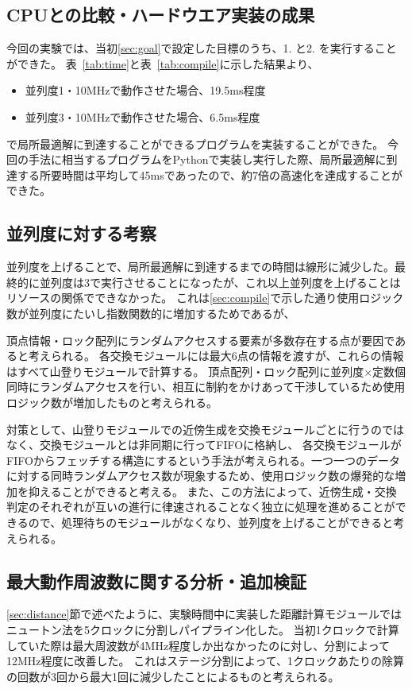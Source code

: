 \subsection{CPUとの比較・ハードウエア実装の成果}
今回の実験では、当初\ref{sec:goal}で設定した目標のうち、1. と2. を実行することができた。
表~\ref{tab:time}と表~\ref{tab:compile}に示した結果より、
\begin{itemize}
    \item 並列度1・10MHzで動作させた場合、19.5ms程度
    \item 並列度3・10MHzで動作させた場合、6.5ms程度
\end{itemize}
で局所最適解に到達することができるプログラムを実装することができた。
今回の手法に相当するプログラムをPythonで実装し実行した際、局所最適解に到達する所要時間は平均して45msであったので、約7倍の高速化を達成することができた。

\subsection{並列度に対する考察}
並列度を上げることで、局所最適解に到達するまでの時間は線形に減少した。最終的に並列度は3で実行させることになったが、これ以上並列度を上げることはリソースの関係でできなかった。
これは\ref{sec:compile}で示した通り使用ロジック数が並列度にたいし指数関数的に増加するためであるが、

頂点情報・ロック配列にランダムアクセスする要素が多数存在する点が要因であると考えられる。
各交換モジュールには最大6点の情報を渡すが、これらの情報はすべて山登りモジュールで計算する。
頂点配列・ロック配列に並列度×定数個同時にランダムアクセスを行い、相互に制約をかけあって干渉しているため使用ロジック数が増加したものと考えられる。

対策として、山登りモジュールでの近傍生成を交換モジュールごとに行うのではなく、交換モジュールとは非同期に行ってFIFOに格納し、
各交換モジュールがFIFOからフェッチする構造にするという手法が考えられる。一つ一つのデータに対する同時ランダムアクセス数が現象するため、使用ロジック数の爆発的な増加を抑えることができると考える。
また、この方法によって、近傍生成・交換判定のそれぞれが互いの進行に律速されることなく独立に処理を進めることができるので、処理待ちのモジュールがなくなり、並列度を上げることができると考えられる。

\subsection{最大動作周波数に関する分析・追加検証}\label{sec:frequency}
\ref{sec:distance}節で述べたように、実験時間中に実装した距離計算モジュールではニュートン法を5クロックに分割しパイプライン化した。
当初1クロックで計算していた際は最大周波数が4MHz程度しか出なかったのに対し、分割によって12MHz程度に改善した。
これはステージ分割によって、1クロックあたりの除算の回数が3回から最大1回に減少したことによるものと考えられる。

